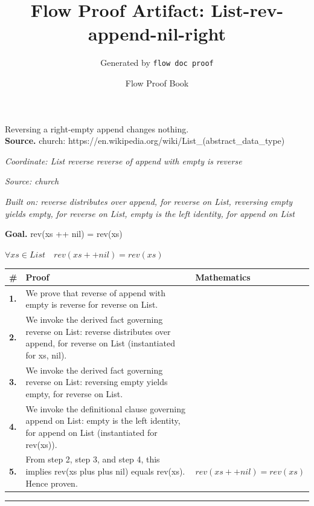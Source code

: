 \documentclass[11pt]{article}
\title{Flow Proof Artifact: List-rev-append-nil-right}
\author{Generated by \texttt{flow doc proof}}
\date{Flow Proof Book}
\theoremstyle{definition}
\begin{document}
\maketitle
Reversing a right-empty append changes nothing.\\[0.5em]
\textbf{Source.} church: https://en.wikipedia.org/wiki/List\_(abstract\_data\_type)\\[0.5em]
\bigskip
{}\par
\smallskip\noindent\textit{Coordinate: List \cdot reverse \cdot reverse of append with empty is reverse}\par
\smallskip\noindent\textit{Source: church}\par
\smallskip\noindent\textit{Built on: reverse distributes over append, for reverse on List, reversing empty yields empty, for reverse on List, empty is the left identity, for append on List}\par
\medskip
\noindent\textbf{Goal.} rev(xs ++ nil) = rev(xs)\par
\noindent$\displaystyle \forall xs \in List\quad rev(xs ++ nil) = rev(xs)$\par
\medskip
\noindent
\begin{tabular}{@{} >{\raggedright\arraybackslash}p{} >{\raggedright\arraybackslash}p{} >{\raggedleft\arraybackslash}p{} @{}}
\textbf{\#} & \textbf{Proof} & \textbf{Mathematics} \\
\midrule
\textbf{1.} & We prove that reverse of append with empty is reverse for reverse on List. & \\[0.45em]
\textbf{2.} & We invoke the derived fact governing reverse on List: reverse distributes over append, for reverse on List (instantiated for xs, nil). & \\[0.45em]
\textbf{3.} & We invoke the derived fact governing reverse on List: reversing empty yields empty, for reverse on List. & \\[0.45em]
\textbf{4.} & We invoke the definitional clause governing append on List: empty is the left identity, for append on List (instantiated for rev(xs)). & \\[0.45em]
\textbf{5.} & From step 2, step 3, and step 4, this implies rev(xs plus plus nil) equals rev(xs). Hence proven. & $\displaystyle rev(xs ++ nil) = rev(xs)$ \\[0.45em]
\bottomrule
\end{tabular}
\label{thm:List-reverse-reverse_of_append_with_empty_is_reverse}
\par\medskip\hrule
\end{document}
